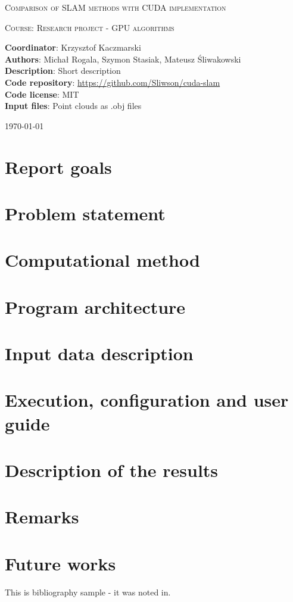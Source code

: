 \documentclass[titlepage]{article}
\begin{document}
\begin{titlepage}
	{\centering
	{\scshape\huge Comparison of SLAM methods with CUDA implementation \par}
	\vspace{1cm}
	{\scshape\Large Course: Research project - GPU algorithms \par}}
	
	\vspace{1cm}
	\noindent\textbf{Coordinator}: Krzysztof Kaczmarski\\
	\textbf{Authors}: Michał Rogala, Szymon Stasiak, Mateusz Śliwakowski\\
	\textbf{Description}: Short description\\
	\textbf{Code repository}: \href{https://github.com/Sliwson/cuda-slam}{https://github.com/Sliwson/cuda-slam}\\
	\textbf{Code license}: MIT\\
	\textbf{Input files}: Point clouds as .obj files\\

	\vfill
	{\large \today \par}
\end{titlepage}

\tableofcontents
\newpage

\section{Report goals}
\section{Problem statement}
\section{Computational method}
\section{Program architecture}
\section{Input data description}
\section{Execution, configuration and user guide}
\section{Description of the results}
\section{Remarks}
\section{Future works}
This is bibliography sample - it was noted in\cite{ms-paper1}.

\newpage
\printbibliography
\end{document}
